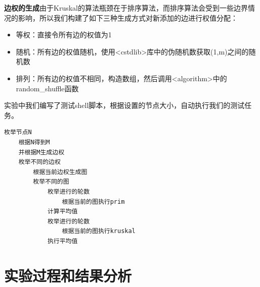 \documentclass[UTF8]{ctexart}
\begin{document}
\textbf{边权的生成}\quad 由于Kruskal的算法瓶颈在于排序算法，而排序算法会受到一些边界情况的影响，所以我们构建了如下三种生成方式对新添加的边进行权值分配：
\begin{itemize}
    \item 等权：直接令所有边的权值为1
    \item 随机：所有边的权值随机，使用<cstdlib>库中的伪随机数获取(1,m)之间的随机数
    \item 排列：所有边的权值不相同，构造数组，然后调用<algorithm>中的random\_shuffle函数
\end{itemize}

实验中我们编写了测试shell脚本，根据设置的节点大小，自动执行我们的测试任务。
\begin{lstlisting}
枚举节点N   
	根据N得到M
    并根据M生成边权
    枚举不同的边权
        根据当前边权生成图
		枚举不同的图
			枚举进行的轮数
				根据当前的图执行prim
			计算平均值
			枚举进行的轮数
				根据当前的图执行kruskal
			执行平均值
\end{lstlisting}

\section{实验过程和结果分析}
\end{document}
